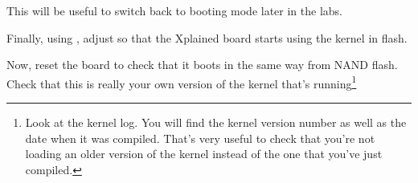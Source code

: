 
This will be useful to switch back to  booting mode
later in the labs.

Finally, using ,
adjust  so that the Xplained board starts
using the kernel in flash.

Now, reset the board to check that it boots
in the same way from NAND flash. Check that this is really your own version of
the kernel that's running\footnote{Look at the kernel log. You will find
the kernel version number as well as the date when it was compiled.
That's very useful to check that you're not loading an older version
of the kernel instead of the one that you've just compiled.}

